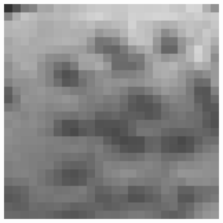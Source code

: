 \documentclass[review,numbers,sort&compress]{elsarticle}  %
\begin{document}
\begin{figure}[htbp]
{\begin{minipage}[b]{0.17\textwidth}
                \includegraphics[width=1\textwidth]{compareImage/OUR_flowers_mag_G_2.png}
            \end{minipage}
        }
\end{figure}
\end{document}
